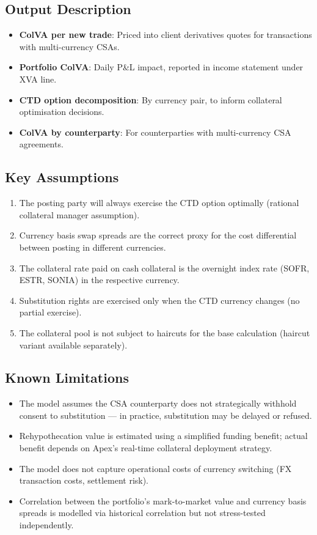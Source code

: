 \documentclass[11pt,a4paper]{article}
\begin{document}
\subsection{Output Description}

\begin{itemize}[leftmargin=*]
  \item \textbf{ColVA per new trade}: Priced into client derivatives quotes for transactions with multi-currency CSAs.
  \item \textbf{Portfolio ColVA}: Daily P\&L impact, reported in income statement under XVA line.
  \item \textbf{CTD option decomposition}: By currency pair, to inform collateral optimisation decisions.
  \item \textbf{ColVA by counterparty}: For counterparties with multi-currency CSA agreements.
\end{itemize}

\subsection{Key Assumptions}

\begin{enumerate}[leftmargin=*]
  \item The posting party will always exercise the CTD option optimally (rational collateral manager assumption).
  \item Currency basis swap spreads are the correct proxy for the cost differential between posting in different currencies.
  \item The collateral rate paid on cash collateral is the overnight index rate (SOFR, ESTR, SONIA) in the respective currency.
  \item Substitution rights are exercised only when the CTD currency changes (no partial exercise).
  \item The collateral pool is not subject to haircuts for the base calculation (haircut variant available separately).
\end{enumerate}

\subsection{Known Limitations}

\begin{itemize}[leftmargin=*]
  \item The model assumes the CSA counterparty does not strategically withhold consent to substitution --- in practice, substitution may be delayed or refused.
  \item Rehypothecation value is estimated using a simplified funding benefit; actual benefit depends on Apex's real-time collateral deployment strategy.
  \item The model does not capture operational costs of currency switching (FX transaction costs, settlement risk).
  \item Correlation between the portfolio's mark-to-market value and currency basis spreads is modelled via historical correlation but not stress-tested independently.
\end{itemize}
\end{document}
